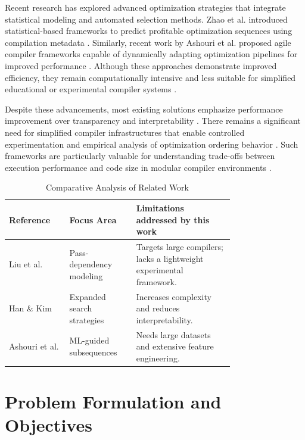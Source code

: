 \documentclass[conference]{IEEEtran}
\begin{document}
Recent research has explored advanced optimization strategies that integrate statistical modeling and automated selection methods. Zhao et al. introduced statistical-based frameworks to predict profitable optimization sequences using compilation metadata \cite{ref7}. Similarly, recent work by Ashouri et al. proposed agile compiler frameworks capable of dynamically adapting optimization pipelines for improved performance \cite{ref27}. Although these approaches demonstrate improved efficiency, they remain computationally intensive and less suitable for simplified educational or experimental compiler systems \cite{ref27}.

Despite these advancements, most existing solutions emphasize performance improvement over transparency and interpretability \cite{ref2}. There remains a significant need for simplified compiler infrastructures that enable controlled experimentation and empirical analysis of optimization ordering behavior \cite{ref1}. Such frameworks are particularly valuable for understanding trade-offs between execution performance and code size in modular compiler environments \cite{ref19}.

\begin{table}[htbp]
\caption{Comparative Analysis of Related Work}
\begin{center}
\begin{tabular}{|p{0.2\linewidth}|p{0.2\linewidth}|p{0.35\linewidth}|}
\hline
\textbf{Reference} & \textbf{Focus Area} & \textbf{Limitations addressed by this work} \\
\hline
Liu et al. \cite{ref1} & Pass-dependency modeling & Targets large compilers; lacks a lightweight experimental framework. \\
\hline
Han \& Kim \cite{ref2} & Expanded search strategies & Increases complexity and reduces interpretability. \\
\hline
Ashouri et al. \cite{ref15} & ML-guided subsequences & Needs large datasets and extensive feature engineering. \\
\hline
\end{tabular}
\label{tab:lit_review}
\end{center}
\end{table}

\section{Problem Formulation and Objectives}
\end{document}
